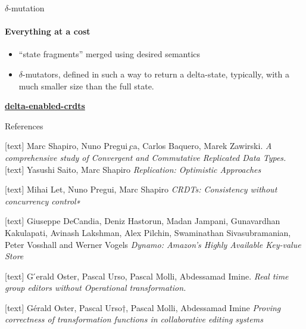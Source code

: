 \documentclass{beamer}
\begin{document}
\begin{frame}{$\delta$-mutation}
\framesubtitle{Everything at a cost}

\begin{itemize}
	\item “state fragments” merged using desired semantics
	\item ${\delta}$-mutators, defined in such a way to return a delta-state, typically, with a much smaller size than the full state.
\end{itemize}

\center
\textbf{\href{https://github.com/CBaquero/delta-enabled-crdts}{delta-enabled-crdts}} 
\end{frame}


\begin{frame}{References}

\begin{thebibliography}{9}
[text]
Marc Shapiro, Nuno Pregui ̧ca, Carlos Baquero, Marek Zawirski. 
\textit{A comprehensive study of Convergent and Commutative Replicated Data Types.}
[text]
Yasushi Saito, Marc Shapiro
\textit{Replication: Optimistic Approaches}

[text]
Mihai Let, Nuno Pregui, Marc Shapiro
\textit{CRDTs: Consistency without concurrency control∗}

[text]
Giuseppe DeCandia, Deniz Hastorun, Madan Jampani, Gunavardhan Kakulapati, Avinash Lakshman, Alex Pilchin, Swaminathan Sivasubramanian, Peter Vosshall and Werner Vogels
\textit{Dynamo: Amazon’s Highly Available Key-value Store}

[text]
G ́erald Oster, Pascal Urso, Pascal Molli, Abdessamad Imine. 
\textit{Real time group editors without Operational transformation.}

[text]
Gérald Oster, Pascal Urso†, Pascal Molli, Abdessamad Imine
\textit{Proving correctness of transformation functions in collaborative editing systems}

\end{thebibliography}	

\end{frame}
\end{document}

